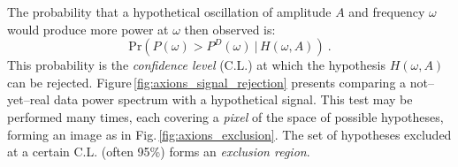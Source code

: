 The probability that a hypothetical oscillation of amplitude $A$ and frequency $\omega$ would produce more power at $\omega$ then observed is:
\begin{equation}
  \mathrm{Pr}\left( P(\omega) > P^D(\omega)\ |\, H(\omega, A) \right) \ .
\end{equation}
This probability is the \emph{confidence level} (C.L.) at which the hypothesis $H(\omega, A)$ can be rejected. Figure\,\ref{fig:axions_signal_rejection} presents comparing a not--yet--real data power spectrum with a hypothetical signal. This test may be performed many times, each covering a \emph{pixel} of the space of possible hypotheses, forming an image as in Fig.\,\ref{fig:axions_exclusion}. The set of hypotheses excluded at a certain C.L. (often 95\%) forms an \emph{exclusion region}.


